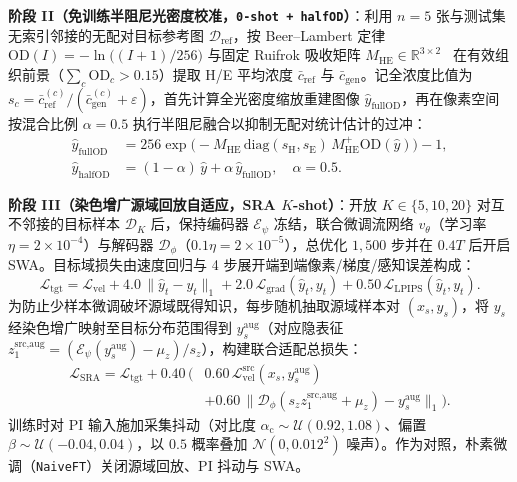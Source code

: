 \documentclass[journal]{IEEEtran}
\begin{document}
\noindent\textbf{阶段 II（免训练半阻尼光密度校准，\texttt{0-shot + halfOD}）}：利用 $n=5$ 张与测试集无索引邻接的无配对目标参考图 $\mathcal{D}_{\text{ref}}$，按 Beer--Lambert 定律 $\text{OD}(I) = -\ln\big((I+1)/256\big)$ 与固定 Ruifrok 吸收矩阵 $M_{\text{HE}} \in \mathbb{R}^{3\times 2}$~\cite{ref_ruifrok} 在有效组织前景（$\sum_c \text{OD}_c > 0.15$）提取 H/E 平均浓度 $\bar{c}_{\text{ref}}$ 与 $\bar{c}_{\text{gen}}$。记全浓度比值为 $s_c = \bar{c}_{\text{ref}}^{(c)} / (\bar{c}_{\text{gen}}^{(c)} + \varepsilon)$，首先计算全光密度缩放重建图像 $\hat{y}_{\text{fullOD}}$，再在像素空间按混合比例 $\alpha = 0.5$ 执行半阻尼融合以抑制无配对统计估计的过冲：
\begin{equation}
\begin{aligned}
\hat{y}_{\text{fullOD}} &= 256\exp\big(-M_{\text{HE}}\,\text{diag}(s_{\text{H}}, s_{\text{E}})\,M_{\text{HE}}^+ \text{OD}(\hat{y})\big) - 1, \\
\hat{y}_{\text{halfOD}} &= (1 - \alpha)\,\hat{y} + \alpha\,\hat{y}_{\text{fullOD}}, \quad \alpha = 0.5.
\end{aligned}
\end{equation}

\noindent\textbf{阶段 III（染色增广源域回放自适应，SRA $K$-shot）}：开放 $K \in \{5, 10, 20\}$ 对互不邻接的目标样本 $\mathcal{D}_K$ 后，保持编码器 $\mathcal{E}_\psi$ 冻结，联合微调流网络 $v_\theta$（学习率 $\eta = 2\times 10^{-4}$）与解码器 $\mathcal{D}_\phi$（$0.1\eta = 2\times 10^{-5}$），总优化 $1{,}500$ 步并在 $0.4T$ 后开启 SWA。目标域损失由速度回归与 4 步展开端到端像素/梯度/感知误差构成：
\begin{equation}
\mathcal{L}_{\text{tgt}} = \mathcal{L}_{\text{vel}} + 4.0\,\|\hat{y}_t - y_t\|_1 + 2.0\,\mathcal{L}_{\text{grad}}(\hat{y}_t, y_t) + 0.50\,\mathcal{L}_{\text{LPIPS}}(\hat{y}_t, y_t).
\end{equation}
为防止少样本微调破坏源域既得知识，每步随机抽取源域样本对 $(x_s, y_s)$，将 $y_s$ 经染色增广映射至目标分布范围得到 $y_s^{\text{aug}}$（对应隐表征 $z_1^{\text{src,aug}} = (\mathcal{E}_\psi(y_s^{\text{aug}}) - \mu_z)/s_z$），构建联合适配总损失：
\begin{equation}
\begin{aligned}
\mathcal{L}_{\text{SRA}} = \mathcal{L}_{\text{tgt}} + 0.40\,\Big( & 0.60\,\mathcal{L}_{\text{vel}}^{\text{src}}(x_s, y_s^{\text{aug}}) \\
& + 0.60\,\|\mathcal{D}_\phi(s_z z_1^{\text{src,aug}} + \mu_z) - y_s^{\text{aug}}\|_1\Big).
\end{aligned}
\end{equation}
训练时对 PI 输入施加采集抖动（对比度 $\alpha_{\text{c}} \sim \mathcal{U}(0.92, 1.08)$、偏置 $\beta \sim \mathcal{U}(-0.04, 0.04)$，以 $0.5$ 概率叠加 $\mathcal{N}(0, 0.012^2)$ 噪声）。作为对照，朴素微调（\texttt{NaiveFT}）关闭源域回放、PI 抖动与 SWA。
\end{document}
